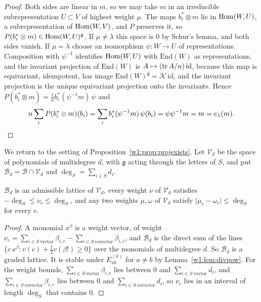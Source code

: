 \begin{proof}
Both sides are linear in $m$, so we may take $m$ in an irreducible subrepresentation $U\subset V$ of highest weight $\mu$. The maps $b_i^*\otimes m$ lie in $\operatorname{Hom}(W,U)$, a subrepresentation of $\operatorname{Hom}(W,V)$, and $P$ preserves it, so $P(b_i^*\otimes m)\in\operatorname{Hom}(W,U)^{\mathfrak g}$. If $\mu\ne\lambda$ this space is $0$ by Schur's lemma, and both sides vanish. If $\mu=\lambda$ choose an isomorphism $\psi\colon W\to U$ of representations. Composition with $\psi^{-1}$ identifies $\operatorname{Hom}(W,U)$ with $\mathrm{End}(W)$ as representations, and the invariant projection of $\mathrm{End}(W)$ is $A\mapsto(\operatorname{tr} A/n)\,\mathrm{id}$, because this map is equivariant, idempotent, has image $\mathrm{End}(W)^{\mathfrak g}=\mathcal K\,\mathrm{id}$, and the invariant projection is the unique equivariant projection onto the invariants. Hence $P(b_i^*\otimes m)=\frac1nb_i^*(\psi^{-1}m)\,\psi$ and
\[
n\sum_iP(b_i^*\otimes m)(b_i)=\sum_ib_i^*(\psi^{-1}m)\,\psi(b_i)=\psi\psi^{-1}m=m=e_\lambda(m).\qedhere
\]
\end{proof}

We return to the setting of Proposition~\ref{w1:prop:projexists}. Let $\mathcal V_d$ be the space of polynomials of multidegree $d$, with $\mathfrak g$ acting through the letters of $S$, and put $\mathcal B_d=\mathcal B\cap\mathcal V_d$ and $\deg_S=\sum_{i\in S}d_i$.

\begin{lemma}\label{w1:lem:Badm}
$\mathcal B_d$ is an admissible lattice of $\mathcal V_d$, every weight $\nu$ of $\mathcal V_d$ satisfies $-\deg_S\le\nu_c\le\deg_S$, and any two weights $\mu,\omega$ of $\mathcal V_d$ satisfy $\lvert\mu_c-\omega_c\rvert\le\deg_S$ for every $c$.
\end{lemma}

\begin{proof}
A monomial $x^\beta$ is a weight vector, of weight $\nu_c=\sum_{i\in S\ \mathrm{vector}}\beta_{i,c}-\sum_{i\in S\ \mathrm{covector}}\beta_{i,c}$, and $\mathcal B_d$ is the direct sum of the lines $\{c\,x^\beta:v(c)+\frac12v(\beta!)\ge0\}$ over the monomials of multidegree $d$. So $\mathcal B_d$ is a graded lattice. It is stable under $E_{ab}^{(k)}$ for $a\ne b$ by Lemma~\ref{w1:lem:divpow}. For the weight bounds, $\sum_{i\in S\ \mathrm{vector}}\beta_{i,c}$ lies between $0$ and $\sum_{i\in S\ \mathrm{vector}}d_i$, and $\sum_{i\in S\ \mathrm{covector}}\beta_{i,c}$ lies between $0$ and $\sum_{i\in S\ \mathrm{covector}}d_i$, so $\nu_c$ lies in an interval of length $\deg_S$ that contains $0$.
\end{proof}

